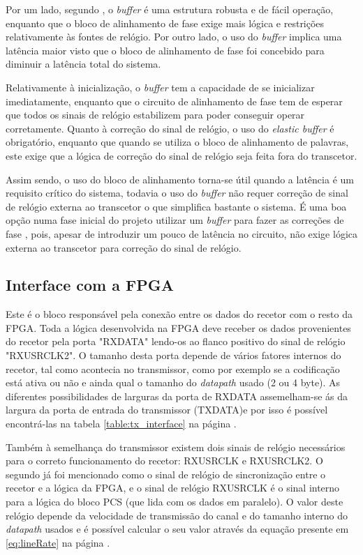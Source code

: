 Por um lado, segundo \cite{R011}, o \textit{buffer} é uma estrutura robusta e de fácil operação, enquanto que o bloco de alinhamento de fase exige mais lógica e restrições relativamente às fontes de relógio. Por outro lado, o uso do \textit{buffer} implica uma latência maior visto que o bloco de alinhamento de fase foi concebido para diminuir a latência total do sistema. 

Relativamente à inicialização, o \textit{buffer} tem a capacidade de se inicializar imediatamente, enquanto que o circuito de alinhamento de fase tem de esperar que todos os sinais de relógio estabilizem para poder conseguir operar corretamente. Quanto à correção do sinal de relógio, o uso do\textit{ elastic buffer} é obrigatório, enquanto que quando se utiliza o bloco de alinhamento de palavras, este exige que a lógica de correção do sinal de relógio seja feita fora do transcetor.

Assim sendo, o uso do bloco de alinhamento torna-se útil quando a latência é um requisito crítico do sistema, todavia o uso do \textit{buffer} não requer correção de sinal de relógio externa ao transcetor o que simplifica bastante o sistema. É uma boa opção numa fase inicial do projeto utilizar um \textit{buffer} para fazer as correções de fase , pois, apesar de introduzir um pouco de latência no circuito, não exige lógica externa ao transcetor para correção do sinal de relógio.

\subsection{Interface com a FPGA}

Este é o bloco responsável pela conexão entre os dados do recetor com o resto da FPGA. Toda a lógica desenvolvida na FPGA deve receber os dados provenientes do recetor pela porta "RXDATA" lendo-os ao flanco positivo do sinal de relógio "RXUSRCLK2". O tamanho desta porta depende de vários fatores internos do recetor, tal como acontecia no transmissor,  como por exemplo se a codificação está ativa ou não e ainda qual o tamanho do \textit{datapath} usado (2 ou 4 byte). As diferentes possibilidades de larguras da porta de RXDATA assemelham-se ás da largura da porta de entrada do transmissor (TXDATA)e por isso é possível encontrá-las na tabela \ref{table:tx_interface} na página \pageref{table:tx_interface}.

Também à semelhança do transmissor existem dois sinais de relógio necessários para o correto funcionamento do recetor: RXUSRCLK e RXUSRCLK2. O segundo já foi mencionado como o sinal de relógio de sincronização entre o recetor e a lógica da FPGA, e o sinal de relógio RXUSRCLK é o sinal interno para a lógica do bloco PCS (que lida com os dados em paralelo). O valor deste relógio depende da velocidade de transmissão do canal e do tamanho interno do \textit{datapath} usados e é possível calcular o seu valor através da equação presente em \ref{eq:lineRate} na página \pageref{eq:lineRate}.

